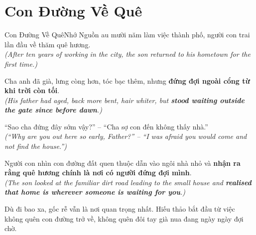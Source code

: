 \section{Con Đường Về Quê}
\begin{truyen}{Con Đường Về Quê}{Nhớ Nguồn}
au mười năm làm việc thành phố, người con trai lần đầu về thăm quê hương.\\
\textit{(After ten years of working in the city, the son returned to his hometown for the first time.)}

Cha anh đã già, lưng còng hơn, tóc bạc thêm, nhưng \textbf{đứng đợi ngoài cổng từ khi trời còn tối}.\\
\textit{(His father had aged, back more bent, hair whiter, but \textbf{stood waiting outside the gate since before dawn}.)}

``Sao cha đứng đây sớm vậy?'' – ``Cha sợ con đến không thấy nhà.''\\
\textit{(``Why are you out here so early, Father?'' – ``I was afraid you would come and not find the house.'')}

Người con nhìn con đường đất quen thuộc dẫn vào ngôi nhà nhỏ và \textbf{nhận ra rằng quê hương chính là nơi có người đứng đợi mình}.\\
\textit{(The son looked at the familiar dirt road leading to the small house and \textbf{realised that home is wherever someone is waiting for you}.)}
\end{truyen}
\begin{baihoc}
  Dù đi bao xa, gốc rễ vẫn là nơi quan trọng nhất. Hiếu thảo bắt đầu từ việc không quên con đường trở về, không quên đôi tay già nua đang ngày ngày đợi chờ.
\end{baihoc}


